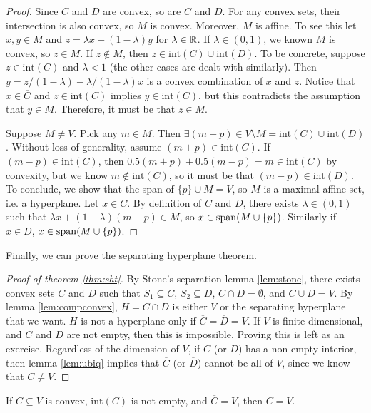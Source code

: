 \begin{proof}
  Since $C$ and $D$ are convex, so are $\overline{C}$ and
  $\overline{D}$. For any convex sets, their intersection is also
  convex, so $M$ is convex. Moreover, $M$ is affine. To see this let
  $x,y \in M$ and $z = \lambda x + (1-\lambda) y $ for $\lambda \in
  \mathbb{R}$. If $\lambda \in (0,1)$, we known $M$ is convex, so $z \in
  M$. If $z \not\in M$, then $z \in \mathrm{int}(C) \cup
  \mathrm{int}(D)$. To be concrete, suppose $z \in \mathrm{int}(C)$ and $\lambda<1$
  (the other cases are dealt with similarly). Then $y = z/(1-\lambda)
  - \lambda/(1-\lambda) x$ is a convex combination of $x$ and
  $z$. Notice that $x \in \overline{C}$ and $z \in \mathrm{int}(C)$ implies
  $y \in \mathrm{int}(C)$, but this contradicts the assumption that $y
  \in M$. Therefore, it must be that $z \in M$. 

  Suppose $M \neq V$. Pick any $m \in M$. Then
  $\exists (m+p) \in V \setminus M = \mathrm{int}(C) \cup
  \mathrm{int}(D)$.
  Without loss of generality, assume $(m+p) \in \mathrm{int}(C)$.  If
  $(m-p) \in \mathrm{int}(C)$, then
  $0.5(m+p) + 0.5(m-p) = m \in \mathrm{int}(C)$ by convexity, but we
  know $m \not\in \mathrm{int}(C)$, so it must be that
  $(m-p) \in \mathrm{int}(D)$. To conclude, we show that the span of
  $\{p\} \cup M = V$, so $M$ is a maximal affine set, i.e. a
  hyperplane. Let $x \in C$. By definition of $\overline{C}$ and
  $\overline{D}$, there exists $\lambda \in (0,1)$ such that
  $\lambda x + (1-\lambda) (m-p) \in M$, so
  $x \in \mathrm{span}(M \cup \{p\})$. Similarly if $x \in D$,
  $x \in \mathrm{span}(M \cup \{p\})$.
\end{proof}
Finally, we can prove the separating hyperplane theorem.
\begin{proof}[Proof of theorem \ref{thm:sht}]
  By Stone's separation lemma \ref{lem:stone}, there exists convex
  sets $C$ and $D$ such that $S_1 \subseteq C$, $S_2 \subseteq D$,
  $C \cap D = \emptyset$, and $C \cup D = V$. By lemma
  \ref{lem:compconvex}, $H = \overline{C} \cap \overline{D}$ is either
  $V$ or the separating hyperplane that we want. $H$ is not a
  hyperplane only if $\overline{C} = \overline{D} = V$. If $V$ is
  finite dimensional, and $C$ and $D$ are not empty, then this is
  impossible. Proving this is left as an exercise. Regardless of the
  dimension of $V$, if $C$ (or $D$) has a non-empty interior, then
  lemma \ref{lem:ubiq} implies that $\overline{C}$ (or $\overline{D}$)
  cannot be all of $V$, since we know that $C \neq V$.
\end{proof}
\begin{lemma}\label{lem:ubiq}
  If $C \subseteq V$ is convex, $\mathrm{int}(C)$ is not empty, and
  $\overline{C} = V$, then $C = V$. 
\end{lemma}
